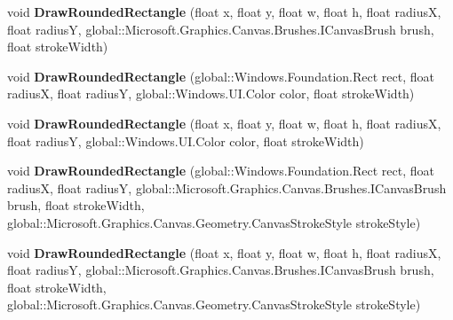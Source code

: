 \begin{DoxyCompactItemize}
void {\bfseries Draw\+Rounded\+Rectangle} (float x, float y, float w, float h, float radiusX, float radiusY, global\+::\+Microsoft.\+Graphics.\+Canvas.\+Brushes.\+I\+Canvas\+Brush brush, float stroke\+Width)
\item 
\mbox{\label{interface_microsoft_1_1_graphics_1_1_canvas_1_1_i_canvas_drawing_session_aed38b7f6c741ca5c56a83f9581d81dca}} 
void {\bfseries Draw\+Rounded\+Rectangle} (global\+::\+Windows.\+Foundation.\+Rect rect, float radiusX, float radiusY, global\+::\+Windows.\+U\+I.\+Color color, float stroke\+Width)
\item 
\mbox{\label{interface_microsoft_1_1_graphics_1_1_canvas_1_1_i_canvas_drawing_session_ae90fe213640a24a7f37e6b74de2ee531}} 
void {\bfseries Draw\+Rounded\+Rectangle} (float x, float y, float w, float h, float radiusX, float radiusY, global\+::\+Windows.\+U\+I.\+Color color, float stroke\+Width)
\item 
\mbox{\label{interface_microsoft_1_1_graphics_1_1_canvas_1_1_i_canvas_drawing_session_a4452172bd34570eda5770c3162df0150}} 
void {\bfseries Draw\+Rounded\+Rectangle} (global\+::\+Windows.\+Foundation.\+Rect rect, float radiusX, float radiusY, global\+::\+Microsoft.\+Graphics.\+Canvas.\+Brushes.\+I\+Canvas\+Brush brush, float stroke\+Width, global\+::\+Microsoft.\+Graphics.\+Canvas.\+Geometry.\+Canvas\+Stroke\+Style stroke\+Style)
\item 
\mbox{\label{interface_microsoft_1_1_graphics_1_1_canvas_1_1_i_canvas_drawing_session_adff21a020b9f84586b717e5aade6a26f}} 
void {\bfseries Draw\+Rounded\+Rectangle} (float x, float y, float w, float h, float radiusX, float radiusY, global\+::\+Microsoft.\+Graphics.\+Canvas.\+Brushes.\+I\+Canvas\+Brush brush, float stroke\+Width, global\+::\+Microsoft.\+Graphics.\+Canvas.\+Geometry.\+Canvas\+Stroke\+Style stroke\+Style)
\item 
\mbox{\label{interface_microsoft_1_1_graphics_1_1_canvas_1_1_i_canvas_drawing_session_ae688a62c6075ccb17c35d731ca230243}} 

\end{DoxyCompactItemize}
